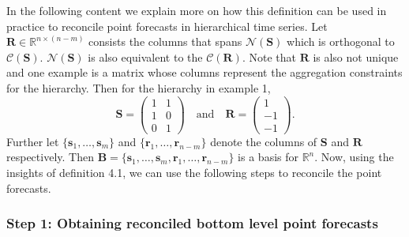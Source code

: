 \documentclass[a4paper, 11pt]{article}
\begin{document}
In the following content we explain more on how this definition can be used in practice to reconcile point forecasts in hierarchical time series. Let $\bm{R} \in \mathbb{R}^{n \times (n-m)}$ consists the columns that spans $\mathscr{N}(\bm{S})$ which is orthogonal to $\mathscr{C}(\bm{S})$. $\mathscr{N}(\bm{S})$ is also equivalent to the $\mathscr{C}(\bm{R})$. Note that $\bm{R}$ is also not unique and one example is a matrix whose columns represent the aggregation constraints for the hierarchy. Then for the hierarchy in example 1,
$$
  \bm{S} =
  \begin{pmatrix}
    1& 1 \\ 1 & 0 \\ 0&1
  \end{pmatrix}
  \quad \text{and} \quad
  \bm{R} =
  \begin{pmatrix}
    1 \\ -1 \\ -1
  \end{pmatrix}.
$$
Further let $\{\bm{s}_1,\dots,\bm{s}_m\}$ and $\{\bm{r}_1,\dots,\bm{r}_{n-m}\}$ denote the columns of $\bm{S}$ and $\bm{R}$ respectively. Then $\bm{B}=\{\bm{s}_1,\dots,\bm{s}_m, \bm{r}_1,\dots,\bm{r}_{n-m}\}$ is a basis for $\mathbb{R}^n$. Now, using the insights of definition 4.1, we can use the following steps to reconcile the point forecasts.

\subsubsection*{Step 1: Obtaining reconciled bottom level point forecasts}
\end{document}
